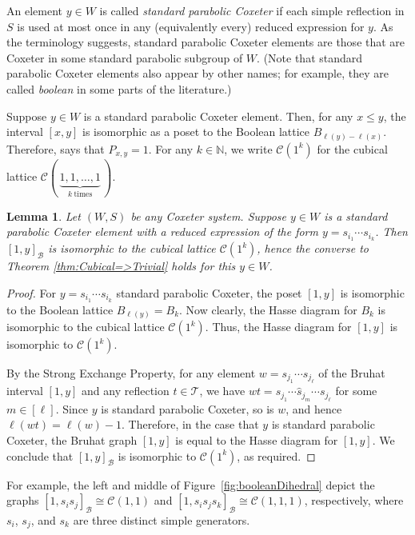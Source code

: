 \documentclass[11pt]{amsart}
\theoremstyle{plain}
\newtheorem{lemma}[thm]{Lemma}
\theoremstyle{definition}
\newcommand{\cC}{\mathcal{C}}
\newcommand{\N}{\mathbb{N}}
\newcommand{\cB}{\mathcal B}
\newcommand{\cT}{\mathcal T}
\newcommand{\Pxy}{P_{x,y}} %
\numberwithin{equation}{subsection}
\begin{document}
An element $y \in W$ is called \emph{standard parabolic Coxeter} if each simple reflection in $S$ is used at most once in any (equivalently every) reduced expression for $y$.  As the terminology suggests, standard parabolic Coxeter elements are those that are Coxeter in some standard parabolic subgroup of $W$.  (Note that standard parabolic Coxeter elements also appear by other names; for example, they are called \emph{boolean} in some parts of the literature.)

Suppose $y \in W$ is a standard parabolic Coxeter element. Then, for any $x \leq y$, the interval $[x,y]$ is isomorphic as a poset to the Boolean lattice $B_{\ell(y) - \ell(x)}$.  Therefore, \cite[Cor.~6.8]{BrentiInv} says that $\Pxy = 1$. For any $k \in \N$, we write $\cC(1^k)$ for the cubical lattice $\cC(\,\underbrace{1,1,\dots, 1}_{k\ \text{times}}\,)$.

\begin{lemma}\label{lem:boolean}
Let $(W,S)$ be any Coxeter system. Suppose $y \in W$ is a standard parabolic Coxeter element with a reduced expression of the form $y = s_{i_1}\cdots s_{i_k}$.  Then $[1,y]_\cB$ is isomorphic to the cubical lattice $\cC(1^k)$, hence the converse to Theorem \ref{thm:Cubical=>Trivial} holds for this $y \in W$.
\end{lemma}

\begin{proof}
For $y = s_{i_1}\cdots s_{i_k}$ standard parabolic Coxeter, the poset $[1,y]$ is isomorphic to the Boolean lattice $B_{\ell(y)} = B_k$. Now clearly, the Hasse diagram for $B_k$ is isomorphic to the cubical lattice $\cC(1^k)$. Thus, the Hasse diagram for $[1,y]$ is isomorphic to $\cC(1^k)$.  

By the Strong Exchange Property, for any element $w = s_{j_1} \cdots s_{j_\ell}$ of the Bruhat interval $[1,y]$ and any reflection $t \in \cT$, we have $wt = s_{j_1} \cdots \widehat{s}_{j_m} \cdots s_{j_\ell}$ for some $m \in [\ell]$.  Since $y$ is standard parabolic Coxeter, so is $w$, and hence $\ell(wt) = \ell(w) -1$.  Therefore, in the case that $y$ is standard parabolic Coxeter, the Bruhat graph $[1,y]$ is equal to the Hasse diagram for $[1,y]$. We conclude that $[1,y]_\cB$ is isomorphic to $\cC(1^k)$, as required.
\end{proof}


For example, the left and middle of Figure~\ref{fig:booleanDihedral} depict the graphs $[1,s_i s_j]_\cB \cong \cC(1,1)$ and $[1,s_i s_js_k]_\cB \cong \cC(1,1,1)$, respectively, where $s_i$, $s_j$, and $s_k$ are three distinct simple generators.
\end{document}
